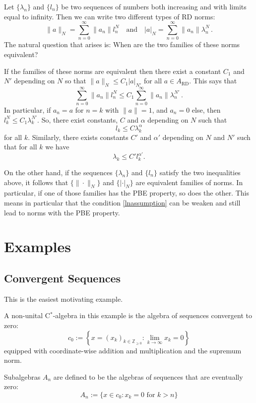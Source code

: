 \documentclass[12pt,reqno]{amsart}
\numberwithin{equation}{section}
\newcommand{\Z}{{\mathbb Z}}
\begin{document}
Let $\{\lambda_n\}$ and $\{l_n\}$ be two sequences of numbers both increasing and with limits equal to infinity.  Then we can write two different types of RD norms:
\begin{equation*}
\|a\|_N = \sum_{n=0}^\infty \|a_n\|l_n^N\quad\textrm{and}\quad |a|_N =\sum_{n=0}^\infty\|a_n\|\lambda_n^N\,.
\end{equation*}
The natural question that arises is: When are the two families of these norms equivalent?

If the families of these norms are equivalent then there exist a constant $C_1$ and $N'$ depending on $N$ so that $\|a\|_N\le C_1|a|_{N'}$ for all $a\in A_\textrm{RD}$.  This says that
\begin{equation*}
\sum_{n=0}^\infty\|a_n\|l_n^N\le C_1\sum_{n=0}^\infty\|a_n\|\lambda_n^{N'}\,.
\end{equation*}
In particular, if $a_n=a$ for $n=k$ with $\|a\|=1$, and $a_n=0$ else, then $l_k^N\le C_1\lambda_k^{N'}$. So, there exist constants, $C$ and $\alpha$ depending on $N$ such that 
$$l_k\le C\lambda_k^\alpha$$ 
for all $k$.  Similarly, there exists constants $C'$ and $\alpha'$ depending on $N$ and $N'$ such that for all $k$ we have 
$$\lambda_k\le C'l_k^{\alpha'}.$$

On the other hand, if the sequences $\{\lambda_n\}$ and $\{l_n\}$ satisfy the two inequalities above, it follows that $\{\|\cdot\|_N\}$ and $\{|\cdot|_N\}$ are equivalent families of norms. In particular, if one of those families has the PBE property, so does the other. This means in particular that the condition \eqref{lnassumption} can be weaken and still lead to norms with the PBE property.

\section{Examples}
\subsection{Convergent Sequences} 
This is the easiest motivating example. 

A non-unital C$^*$-algebra in this example is the algebra of sequences convergent to zero:
\begin{equation*}
c_0:=\left\{x=(x_k)_{k\in\Z_{\geq0}}:\lim_{k\to\infty}x_k=0\right\}
\end{equation*}
equipped with coordinate-wise addition and multiplication and the supremum norm.

Subalgebras $A_n$ are defined to be the algebras of sequences that are eventually zero:
\begin{equation*}
A_n:=\{x\in c_0: x_k=0 \text{ for }k>n\}
\end{equation*}
\end{document}
